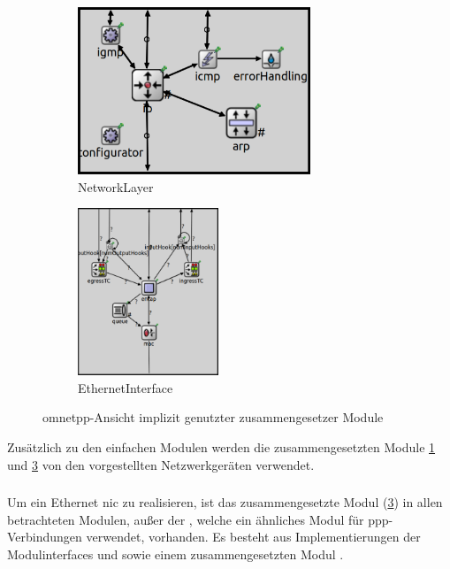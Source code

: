 \begin{figure}[ht]
	\centering
	\begin{subfigure}{0.5\textwidth}
		\includegraphics[width=0.7\linewidth, height=5cm, keepaspectratio]{pic/NetworkLayer}
		\caption[EthernetInterface]{NetworkLayer} 
		\label{fig:networkLayer}
	\end{subfigure}%
	\begin{subfigure}{0.5\textwidth}
		\includegraphics[width=0.7\linewidth, height=5cm, keepaspectratio]{pic/EthernetNic}
		\caption[Networklayer]{EthernetInterface} 
		\label{fig:EthernetInterface}
	\end{subfigure}
	\caption[Networklayer und EthernetInterface]{\gls{omnetpp}-Ansicht implizit genutzter zusammengesetzer Module}
\end{figure}

Zusätzlich zu den einfachen Modulen werden die zusammengesetzten Module  \ref{fig:networkLayer} und  \ref{fig:EthernetInterface} von den vorgestellten Netzwerkgeräten verwendet.

\subsubsection{}
Um ein Ethernet \gls{nic} zu realisieren, ist das zusammengesetzte Modul  (\ref{fig:EthernetInterface}) in allen betrachteten Modulen, außer der , welche ein ähnliches Modul für \gls{ppp}-Verbindungen verwendet, vorhanden. Es besteht aus Implementierungen der Modulinterfaces  und  sowie einem zusammengesetzten Modul .

